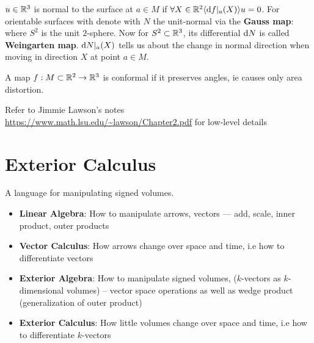 \begin{definition}[Normal]
    $u\in\mathbb{R}^3$ is normal to the surface at $a\in M$ if $\forall X\in\mathbb{R}^2 \langle \mathrm{d} f|_a(X) \rangle{u}=0$. For orientable surfaces with denote with $N$ the unit-normal via the \textbf{Gauss map}:
    where $S^2$ is the unit $2$-sphere. Now for $S^2\subset\mathbb{R}^3$, its differential $\mathrm{d} N$ is called \textbf{Weingarten map}. $\mathrm{d} N|_a(X)$ tells us about the change in normal direction when moving in direction $X$ at point $a\in M$.
\end{definition}

\begin{definition}
    A map $f:M\subset\mathbb{R}^2\to\mathbb{R}^3$ is conformal if it preserves angles, ie causes only area distortion.
\end{definition}

Refer to Jimmie Lawson's notes \url{https://www.math.lsu.edu/~lawson/Chapter2.pdf} for low-level details


\section{Exterior Calculus}

A language for manipulating signed volumes.

\begin{itemize}
    \item \textbf{Linear Algebra}: How to manipulate arrows, vectors --- add, scale, inner product, outer products
    \item \textbf{Vector Calculus}: How arrows change over space and time, i.e how to differentiate vectors
    \item \textbf{Exterior Algebra}: How to manipulate signed volumes, ($k$-vectors as $k$-dimensional volumes) -- vector space operations as well as wedge product (generalization of outer product)
    \item \textbf{Exterior Calculus}: How little volumes change over space and time, i.e how to differentiate $k$-vectors
\end{itemize}

